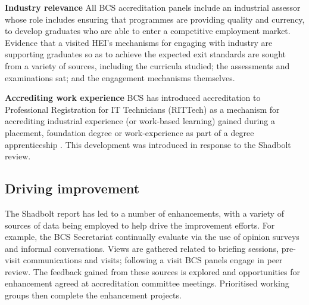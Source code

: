 \documentclass[sigconf]{acmart}
\begin{document}
{\textbf{Industry relevance}} All BCS accreditation panels include an
industrial assessor whose role includes ensuring that programmes are
providing quality and currency, to develop graduates who are able to
enter a competitive employment market. Evidence that a visited HEI's
mechanisms for engaging with industry are supporting graduates so as
to achieve the expected exit standards are sought from a variety of
sources, including the curricula studied; the assessments and
examinations sat; and the engagement mechanisms themselves.



{\textbf{Accrediting work experience}} BCS has introduced
accreditation to Professional Registration for IT Technicians
(RITTech) as a mechanism for accrediting industrial experience (or
work-based learning) gained during a placement, foundation degree or
work-experience as part of a degree apprenticeship
\cite[p8]{BCS2018a}. This development was introduced in response to
the Shadbolt review.

\subsection{Driving improvement}

The Shadbolt report has led to a number of enhancements, with a
variety of sources of data being employed to help drive the improvement
efforts. For example, the BCS Secretariat continually evaluate via the
use of opinion surveys and informal conversations. Views are gathered
related to briefing sessions, pre-visit communications and visits;
following a visit BCS panels engage in peer review. The feedback
gained from these sources is explored and opportunities for
enhancement agreed at accreditation committee meetings. Prioritised
working groups then complete the enhancement projects.
\end{document}
